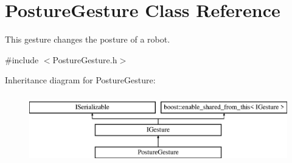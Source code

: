 \hypertarget{class_posture_gesture}{}\section{Posture\+Gesture Class Reference}
\label{class_posture_gesture}


This gesture changes the posture of a robot.  




{\ttfamily \#include $<$Posture\+Gesture.\+h$>$}

Inheritance diagram for Posture\+Gesture\+:\begin{figure}[H]
\begin{center}
\leavevmode
\includegraphics[height=3.000000cm]{class_posture_gesture}
\end{center}
\end{figure}
